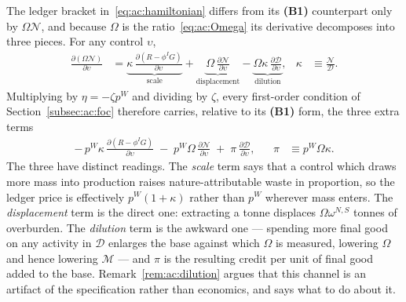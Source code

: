  The ledger bracket in~\eqref{eq:ac:hamiltonian} differs from its \textbf{(B1)} counterpart only by $\Omega\mathcal N$, and because $\Omega$ is the ratio~\eqref{eq:ac:Omega} its derivative decomposes into three pieces. For any control $\upsilon$,
\begin{align}
\frac{\partial\left(\Omega\mathcal N\right)}{\partial\upsilon}
&= \underbrace{\kappa\,\frac{\partial\left(R-\phi^IG\right)}{\partial\upsilon}}_{\text{scale}}
+\underbrace{\Omega\,\frac{\partial\mathcal N}{\partial\upsilon}}_{\text{displacement}}
-\underbrace{\Omega\kappa\,\frac{\partial\mathcal D}{\partial\upsilon}}_{\text{dilution}},
&
\kappa &\equiv \frac{\mathcal N}{\mathcal D}.
\label{eq:ac:OmegaN-derivative}
\end{align}
Multiplying by $\eta=-\zeta p^W$ and dividing by $\zeta$, every first-order condition of Section~\ref{subsec:ac:foc} therefore carries, relative to its \textbf{(B1)} form, the three extra terms
\begin{align}
-\,p^W\kappa\,\frac{\partial\left(R-\phi^IG\right)}{\partial\upsilon}
\;-\;p^W\Omega\,\frac{\partial\mathcal N}{\partial\upsilon}
\;+\;\pi\,\frac{\partial\mathcal D}{\partial\upsilon},
&&
\pi &\equiv p^W\Omega\kappa.
\label{eq:ac:extra-terms}
\end{align}
The three have distinct readings. The \emph{scale} term says that a control which draws more mass into production raises nature-attributable waste in proportion, so the ledger price is effectively $p^W(1+\kappa)$ rather than $p^W$ wherever mass enters. The \emph{displacement} term is the direct one: extracting a tonne displaces $\Omega\omega^{N,S}$ tonnes of overburden. The \emph{dilution} term is the awkward one --- spending more final good on any activity in $\mathcal D$ enlarges the base against which $\Omega$ is measured, lowering $\Omega$ and hence lowering $\mathcal M$ --- and $\pi$ is the resulting credit per unit of final good added to the base. Remark~\ref{rem:ac:dilution} argues that this channel is an artifact of the specification rather than economics, and says what to do about it.

